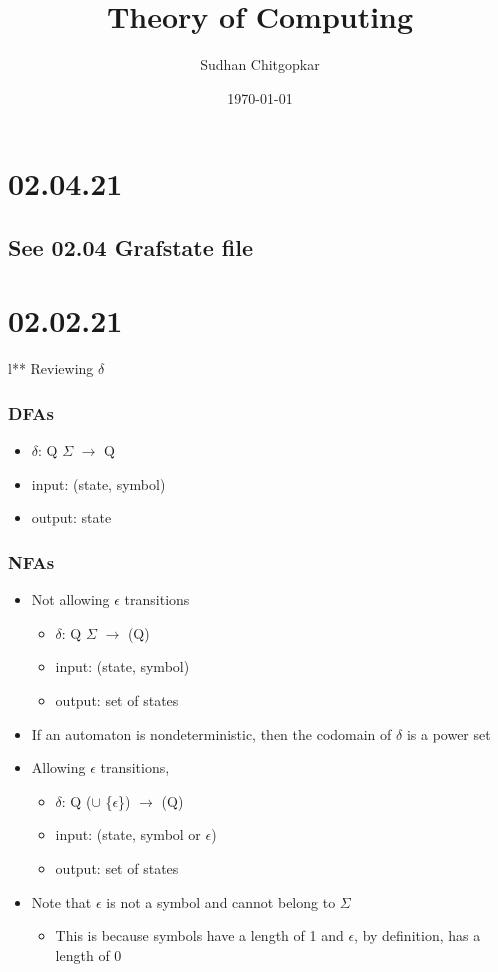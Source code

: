 \documentclass[11pt]{article}
\author{Sudhan Chitgopkar}
\date{\today}
\title{Theory of Computing}
\begin{document}
\maketitle
\section*{02.04.21}
\label{sec:org0666906}
\subsection*{See 02.04 Grafstate file}
\label{sec:org3ed8bd8}
\section*{02.02.21}
\label{sec:orge8c5766}
l** Reviewing \(\delta\)
\subsubsection*{DFAs}
\label{sec:org08d8173}
\begin{itemize}
\item \(\delta\): Q \texttimes{} \(\Sigma\) \(\to\) Q
\item input: (state, symbol)
\item output: state
\end{itemize}
\subsubsection*{NFAs}
\label{sec:orgcfeddb0}
\begin{itemize}
\item Not allowing \(\epsilon\) transitions
\begin{itemize}
\item \(\delta\): Q \texttimes{} \(\Sigma\) \(\to\) \powerset(Q)
\item input: (state, symbol)
\item output: set of states
\end{itemize}
\item If an automaton is nondeterministic, then the codomain of \(\delta\) is a power set
\item Allowing \(\epsilon\) transitions,
\begin{itemize}
\item \(\delta\): Q \texttimes{} (\Simga \(\cup\) \{\(\epsilon\)\}) \(\to\) \powerset(Q)
\item input: (state, symbol or \(\epsilon\))
\item output: set of states
\end{itemize}
\item Note that \(\epsilon\) is not a symbol and cannot belong to \(\Sigma\)
\begin{itemize}
\item This is because symbols have a length of 1 and \(\epsilon\), by definition, has a length of 0
\end{itemize}
\end{itemize}
\end{document}
